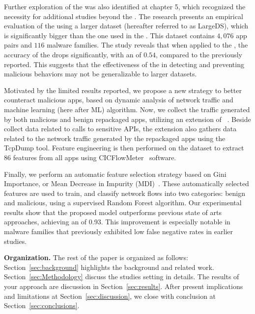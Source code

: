 Further exploration of the \mas was also identified at chapter 5, which recognized the necessity for additional studies beyond the \blls. The research presents an empirical evaluation of the \mas using a larger dataset (hereafter referred to as LargeDS), which is significantly bigger than the one used in the \blls. This dataset contains $4,076$ app pairs and $116$ malware families. The study reveals that when applied to the \cds, the accuracy of the \mas drops significantly, with an \fone of $0.54$, compared to the previously reported. This suggests that the effectiveness of the \mas in detecting and preventing malicious behaviors may not be generalizable to larger datasets.

Motivated by the limited results reported, we propose a new strategy to better counteract malicious apps, based on dynamic analysis of network traffic and machine learning (here after ML) algorithm. Now, we collect the traffic generated by both malicious and benign repackaged apps, utilizing an extension of \droidxp~\cite{DBLP:conf/scam/CostaMCMVBC20}. Beside collect data related to calls to sensitive APIs, the extension also gathers data related to the network traffic generated by the repackaged apps using the TcpDump tool. Feature engineering is then performed on the dataset to extract $86$ features from all apps using CICFlowMeter~\cite{DBLP:conf/icissp/LashkariDMG17} software.

Finally, we perform an automatic feature selection strategy based on Gini Importance, or Mean Decrease in Impurity (MDI)~\cite{james2023introduction}. These automatically selected features are used to train, and classify network flows into two categories: benign and malicious, using a supervised Random Forest algorithm. Our experimental results show that the proposed model outperforms previous state of arts approaches, achieving an \fone of 0.93. This improvement is especially notable in malware families that previously exhibited low false negative rates in earlier studies.\newline\newline


\textbf{Organization.} The rest of the paper is organized as follows: Section~\ref{sec:background} highlights the background and related work. Section~\ref{sec:Methodology} discuss the studies setting in details. The results of your approach are discussion in Section~\ref{sec:results}. After present implications and limitations at Section~\ref{sec:discussion}, we close with conclusion at Section~\ref{sec:conclusions}.



